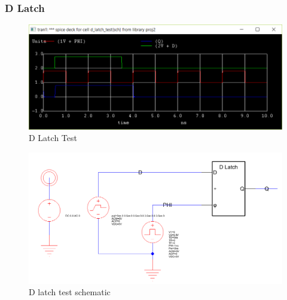 \documentclass[12pt]{report}
\begin{document}
\subsubsection*{D Latch}
\begin{figure}[H]
  \centering
    \includegraphics[width=1.0\textwidth]{d_latch_test.PNG}
  \caption{D Latch Test}
  \label{fig:d_latch_test}
\end{figure}
\begin{figure}[H]
  \centering
    \includegraphics[width=1.0\textwidth]{TestSchematics/d_latch.PNG}
  \caption{D latch test schematic}
\end{figure}
\end{document}
